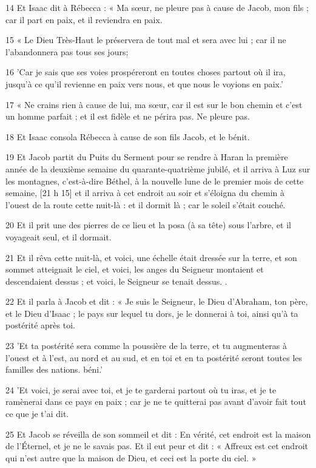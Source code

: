 \par 14 Et Isaac dit à Rébecca : « Ma sœur, ne pleure pas à cause de Jacob, mon fils ; car il part en paix, et il reviendra en paix.
\par 15 « Le Dieu Très-Haut le préservera de tout mal et sera avec lui ; car il ne l'abandonnera pas tous ses jours;
\par 16 'Car je sais que ses voies prospéreront en toutes choses partout où il ira, jusqu'à ce qu'il revienne en paix vers nous, et que nous le voyions en paix.'
\par 17 « Ne crains rien à cause de lui, ma sœur, car il est sur le bon chemin et c'est un homme parfait ; et il est fidèle et ne périra pas. Ne pleure pas.
\par 18 Et Isaac consola Rébecca à cause de son fils Jacob, et le bénit.
\par 19 Et Jacob partit du Puits du Serment pour se rendre à Haran la première année de la deuxième semaine du quarante-quatrième jubilé, et il arriva à Luz sur les montagnes, c'est-à-dire Béthel, à la nouvelle lune de le premier mois de cette semaine, [21 h 15] et il arriva à cet endroit au soir et s'éloigna du chemin à l'ouest de la route cette nuit-là : et il dormit là ; car le soleil s'était couché.
\par 20 Et il prit une des pierres de ce lieu et la posa (à sa tête) sous l'arbre, et il voyageait seul, et il dormait.
\par 21 Et il rêva cette nuit-là, et voici, une échelle était dressée sur la terre, et son sommet atteignait le ciel, et voici, les anges du Seigneur montaient et descendaient dessus ; et voici, le Seigneur se tenait dessus. .
\par 22 Et il parla à Jacob et dit : « Je suis le Seigneur, le Dieu d'Abraham, ton père, et le Dieu d'Isaac ; le pays sur lequel tu dors, je le donnerai à toi, ainsi qu'à ta postérité après toi.
\par 23 'Et ta postérité sera comme la poussière de la terre, et tu augmenteras à l'ouest et à l'est, au nord et au sud, et en toi et en ta postérité seront toutes les familles des nations. béni.'
\par 24 'Et voici, je serai avec toi, et je te garderai partout où tu iras, et je te ramènerai dans ce pays en paix ; car je ne te quitterai pas avant d'avoir fait tout ce que je t'ai dit.
\par 25 Et Jacob se réveilla de son sommeil et dit : En vérité, cet endroit est la maison de l'Éternel, et je ne le savais pas. Et il eut peur et dit : « Affreux est cet endroit qui n'est autre que la maison de Dieu, et ceci est la porte du ciel. »
